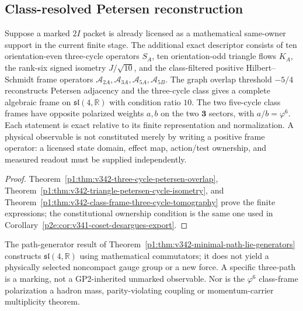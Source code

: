 \documentclass[12pt,a4paper]{article}
\begin{document}
\subsection{Class-resolved Petersen reconstruction}
\begin{corollary}
\label{p2e:cor:v342-threecycle-class-readout-export}
Suppose a marked $2I$ packet is already licensed as a mathematical
same-owner support in the current finite stage.  The additional
exact descriptor consists of ten orientation-even three-cycle
operators $S_A$, ten orientation-odd triangle flows $K_A$,
the rank-six signed isometry $J/\sqrt{10}$, and the
class-filtered positive Hilbert--Schmidt frame operators
$\mathcal A_{2A},\mathcal A_{3A},\mathcal A_{5A},\mathcal A_{5B}$.
The graph overlap threshold $-5/4$ reconstructs Petersen adjacency
and the three-cycle class gives a complete algebraic frame on
$\mathfrak{sl}(4,\mathbb R)$ with condition ratio $10$.
The two five-cycle class frames have opposite polarized weights
$a,b$ on the two $\mathbf3$ sectors, with $a/b=\varphi^6$.
Each statement is exact relative to its finite representation and
normalization.  A physical observable is not constituted merely by
writing a positive frame operator: a licensed state domain,
effect map, action/test ownership, and measured readout must
be supplied independently.
\end{corollary}
\begin{proof}
Theorem~\ref{p1:thm:v342-three-cycle-petersen-overlap},
Theorem~\ref{p1:thm:v342-triangle-petersen-cycle-isometry},
and Theorem~\ref{p1:thm:v342-class-frame-three-cycle-tomography}
prove the finite expressions; the constitutional ownership condition
is the same one used in
Corollary~\ref{p2e:cor:v341-coset-desargues-export}.
\end{proof}
\begin{remark}
\label{p2e:rem:v342-class-frame-no-gauge}
The path-generator result of
Theorem~\ref{p1:thm:v342-minimal-path-lie-generators}
constructs $\mathfrak{sl}(4,\mathbb R)$ using mathematical
commutators; it does not yield a physically selected
noncompact gauge group or a new force.  A specific three-path
is a marking, not a GP2-inherited unmarked observable.  Nor
is the $\varphi^6$ class-frame polarization a hadron mass,
parity-violating coupling or momentum-carrier multiplicity theorem.
\end{remark}
\end{document}
